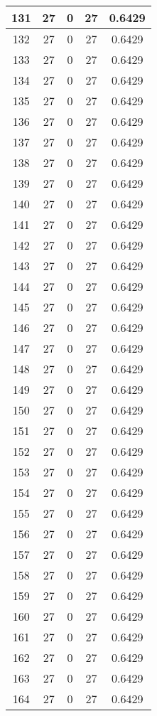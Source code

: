 \documentclass[letterpaper, 12pt]{article}
\begin{document}
\begin{longtable}{|c|c|c|c|c|}
\hline
131 & 27 & 0 & 27 & 0.6429 \\
\hline
132 & 27 & 0 & 27 & 0.6429 \\
\hline
133 & 27 & 0 & 27 & 0.6429 \\
\hline
134 & 27 & 0 & 27 & 0.6429 \\
\hline
135 & 27 & 0 & 27 & 0.6429 \\
\hline
136 & 27 & 0 & 27 & 0.6429 \\
\hline
137 & 27 & 0 & 27 & 0.6429 \\
\hline
138 & 27 & 0 & 27 & 0.6429 \\
\hline
139 & 27 & 0 & 27 & 0.6429 \\
\hline
140 & 27 & 0 & 27 & 0.6429 \\
\hline
141 & 27 & 0 & 27 & 0.6429 \\
\hline
142 & 27 & 0 & 27 & 0.6429 \\
\hline
143 & 27 & 0 & 27 & 0.6429 \\
\hline
144 & 27 & 0 & 27 & 0.6429 \\
\hline
145 & 27 & 0 & 27 & 0.6429 \\
\hline
146 & 27 & 0 & 27 & 0.6429 \\
\hline
147 & 27 & 0 & 27 & 0.6429 \\
\hline
148 & 27 & 0 & 27 & 0.6429 \\
\hline
149 & 27 & 0 & 27 & 0.6429 \\
\hline
150 & 27 & 0 & 27 & 0.6429 \\
\hline
151 & 27 & 0 & 27 & 0.6429 \\
\hline
152 & 27 & 0 & 27 & 0.6429 \\
\hline
153 & 27 & 0 & 27 & 0.6429 \\
\hline
154 & 27 & 0 & 27 & 0.6429 \\
\hline
155 & 27 & 0 & 27 & 0.6429 \\
\hline
156 & 27 & 0 & 27 & 0.6429 \\
\hline
157 & 27 & 0 & 27 & 0.6429 \\
\hline
158 & 27 & 0 & 27 & 0.6429 \\
\hline
159 & 27 & 0 & 27 & 0.6429 \\
\hline
160 & 27 & 0 & 27 & 0.6429 \\
\hline
161 & 27 & 0 & 27 & 0.6429 \\
\hline
162 & 27 & 0 & 27 & 0.6429 \\
\hline
163 & 27 & 0 & 27 & 0.6429 \\
\hline
164 & 27 & 0 & 27 & 0.6429 \\

\end{longtable}
\end{document}
